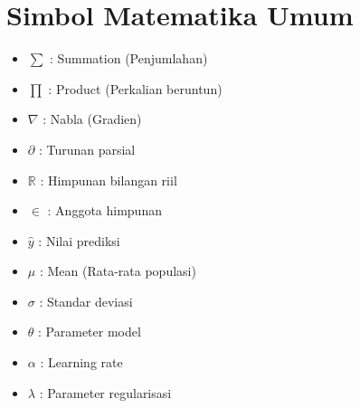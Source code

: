 \section*{Simbol Matematika Umum}
\begin{itemize}
    \item $\sum$ : Summation (Penjumlahan)
    \item $\prod$ : Product (Perkalian beruntun)
    \item $\nabla$ : Nabla (Gradien)
    \item $\partial$ : Turunan parsial
    \item $\mathbb{R}$ : Himpunan bilangan riil
    \item $\in$ : Anggota himpunan
    \item $\hat{y}$ : Nilai prediksi
    \item $\mu$ : Mean (Rata-rata populasi)
    \item $\sigma$ : Standar deviasi
    \item $\theta$ : Parameter model
    \item $\alpha$ : Learning rate
    \item $\lambda$ : Parameter regularisasi
\end{itemize}
